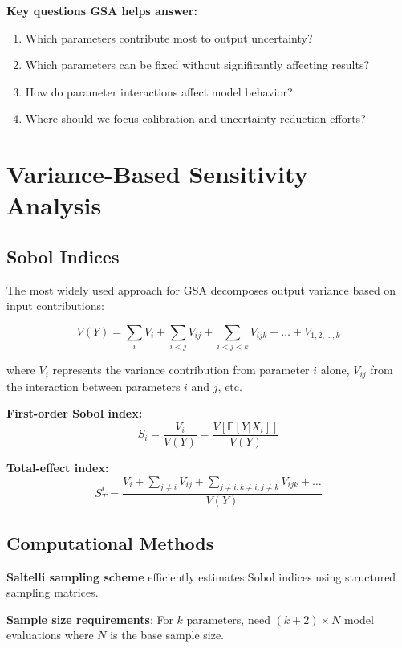 \documentclass[
  letterpaper,
  DIV=11,
  numbers=noendperiod]{scrreprt}
\providecommand{\tightlist}{%
  \setlength{\itemsep}{0pt}\setlength{\parskip}{0pt}}
\begin{document}
\textbf{Key questions GSA helps answer:}

\begin{enumerate}
\def\labelenumi{\arabic{enumi}.}
\tightlist
\item
  Which parameters contribute most to output uncertainty?
\item
  Which parameters can be fixed without significantly affecting results?
\item
  How do parameter interactions affect model behavior?
\item
  Where should we focus calibration and uncertainty reduction efforts?
\end{enumerate}

\section{Variance-Based Sensitivity
Analysis}\label{variance-based-sensitivity-analysis}

\subsection{Sobol Indices}\label{sobol-indices}

The most widely used approach for GSA decomposes output variance based
on input contributions:

\[
V(Y) = \sum_{i} V_i + \sum_{i<j} V_{ij} + \sum_{i<j<k} V_{ijk} + \ldots + V_{1,2,\ldots,k}
\]

where \(V_i\) represents the variance contribution from parameter \(i\)
alone, \(V_{ij}\) from the interaction between parameters \(i\) and
\(j\), etc.

\textbf{First-order Sobol index:} \[
S_i = \frac{V_i}{V(Y)} = \frac{V[\mathbb{E}[Y|X_i]]}{V(Y)}
\]

\textbf{Total-effect index:} \[
S_T^i = \frac{V_i + \sum_{j \neq i} V_{ij} + \sum_{j \neq i, k \neq i, j \neq k} V_{ijk} + \ldots}{V(Y)}
\]

\subsection{Computational Methods}\label{computational-methods}

\textbf{Saltelli sampling scheme} efficiently estimates Sobol indices
using structured sampling matrices.

\textbf{Sample size requirements}: For \(k\) parameters, need
\((k+2) \times N\) model evaluations where \(N\) is the base sample
size.
\end{document}
